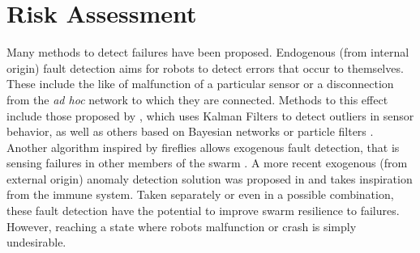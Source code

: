 \section{Risk Assessment}
Many methods to detect failures have been proposed. Endogenous (from internal origin) fault detection aims for robots to detect errors that occur to themselves. These include the like of malfunction of a particular sensor or a disconnection from the \textit{ad hoc} network to which they are connected. Methods to this effect include those proposed by \cite{roumeliotis1998sensor}, which uses Kalman Filters \cite{kalman1960new} to detect outliers in sensor behavior, as well as others based on Bayesian networks \cite{lerner2000bayesian} or particle filters \cite{li2001particle}. Another algorithm inspired by fireflies allows exogenous fault detection, that is sensing failures in other members of the swarm \cite{christensen2009fireflies}. A more recent exogenous (from external origin) anomaly detection solution was proposed in \cite{tarapore2017generic} and takes inspiration from the immune system. Taken separately or even in a possible combination, these fault detection have the potential to improve swarm resilience to failures. However, reaching a state where robots malfunction or crash is simply undesirable.  

